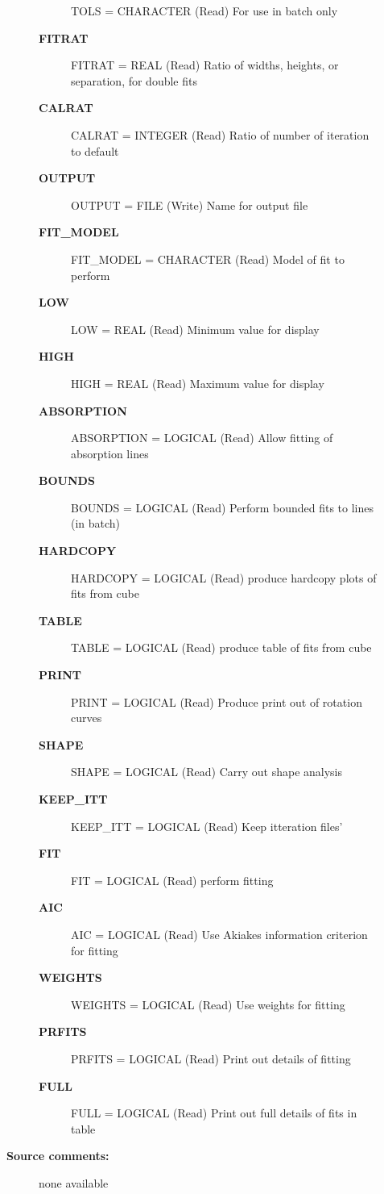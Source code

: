 \begin{description}
\begin{description}
\begin{description}
    TOLS = CHARACTER (Read)
        For use in batch only
\item [\textbf{FITRAT}]
    FITRAT = REAL (Read)
        Ratio of widths, heights, or separation, for double fits
\item [\textbf{CALRAT}]
    CALRAT = INTEGER (Read)
        Ratio of number of iteration to default
\item [\textbf{OUTPUT}]
    OUTPUT = FILE (Write)
        Name for output file
\item [\textbf{FIT\_MODEL}]
    FIT\_MODEL = CHARACTER (Read)
        Model of fit to perform
\item [\textbf{LOW}]
    LOW = REAL (Read)
        Minimum value for display
\item [\textbf{HIGH}]
    HIGH = REAL (Read)
        Maximum value for display
\item [\textbf{ABSORPTION}]
    ABSORPTION = LOGICAL (Read)
        Allow fitting of absorption lines
\item [\textbf{BOUNDS}]
    BOUNDS = LOGICAL (Read)
        Perform bounded fits to lines (in batch)
\item [\textbf{HARDCOPY}]
    HARDCOPY = LOGICAL (Read)
        produce hardcopy plots of fits from cube
\item [\textbf{TABLE}]
    TABLE = LOGICAL (Read)
        produce table of fits from cube
\item [\textbf{PRINT}]
    PRINT = LOGICAL (Read)
        Produce print out of rotation curves
\item [\textbf{SHAPE}]
    SHAPE = LOGICAL (Read)
        Carry out shape analysis
\item [\textbf{KEEP\_ITT}]
    KEEP\_ITT = LOGICAL (Read)
        Keep itteration files'
\item [\textbf{FIT}]
    FIT = LOGICAL (Read)
        perform fitting
\item [\textbf{AIC}]
    AIC = LOGICAL (Read)
        Use Akiakes information criterion for fitting
\item [\textbf{WEIGHTS}]
    WEIGHTS = LOGICAL (Read)
        Use weights for fitting
\item [\textbf{PRFITS}]
    PRFITS = LOGICAL (Read)
        Print out details of fitting
\item [\textbf{FULL}]
    FULL = LOGICAL (Read)
        Print out full details of fits in table
\end{description}

\item [\textbf{Source comments:}]
\begin{terminalv}
  none available


\end{terminalv}
\end{description}
\end{description}
